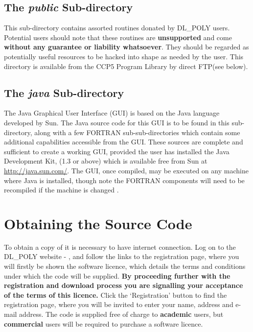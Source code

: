 \subsection{The {\em public} Sub-directory}

This sub-directory contains assorted routines donated by DL\_POLY
users.  Potential users should note that these routines are {\bf
unsupported} and come {\bf without any guarantee or liability
whatsoever}.  They should be regarded as potentially useful
resources to be hacked into shape as needed by the user.  This
directory is available from the CCP5 Program Library
by direct FTP(see below).

\subsection{The {\em java} Sub-directory}

The \D Java Graphical User Interface (GUI) is based on the Java language developed by Sun.  The
Java source code for this GUI is to be found in this
sub-directory, along with a few FORTRAN sub-sub-directories which
contain some additional capabilities accessible from the GUI.
These sources are complete and sufficient to create a working GUI,
provided the user has installed the Java Development Kit, (1.3 or
above) which is available free from Sun at
\href{http://java.sun.com/}{http://java.sun.com/}.
The GUI, once compiled, may be executed
on any machine where Java is installed, though note the FORTRAN
components will need to be recompiled if the machine is changed
\cite{smith-gui}.

\section{Obtaining the Source Code} 

To obtain a copy of \D it is necessary to have internet connection.
Log on to the DL\_POLY website - \WEB{},
and follow the links to the \D registration page, where you will
firstly be shown the \D software licence, which details the
terms and conditions under which the code will be supplied.  {\bf By
proceeding further with the registration and download process you
are signalling your acceptance of the terms of this licence.}  Click
the `Registration' button to find the registration page, where you
will be invited to enter your name, address and e-mail address.  The
code is supplied free of charge to {\bf academic} users, but
{\bf commercial} users will be required to purchase a software licence.

